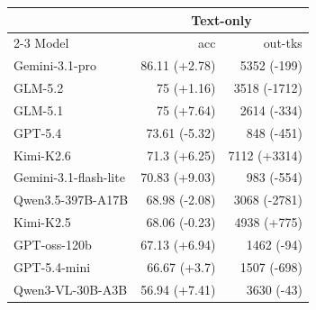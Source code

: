 \centering
\footnotesize
\setlength{\tabcolsep}{4pt}
\label{tab:tool-use-comparison}
\begin{tabular}{lrr}
\toprule
 & \multicolumn{2}{c}{\textbf{Text-only}} \\
\cmidrule(lr){2-3}
Model & acc & out-tks \\
\midrule
Gemini-3.1-pro & 86.11 {\scriptsize\textcolor{green!70!black}{(+2.78)}} & 5352 {\scriptsize\textcolor{green!70!black}{(-199)}} \\
GLM-5.2 & 75 {\scriptsize\textcolor{green!70!black}{(+1.16)}} & 3518 {\scriptsize\textcolor{green!70!black}{(-1712)}} \\
GLM-5.1 & 75 {\scriptsize\textcolor{green!70!black}{(+7.64)}} & 2614 {\scriptsize\textcolor{green!70!black}{(-334)}} \\
GPT-5.4 & 73.61 {\scriptsize\textcolor{red!70!black}{(-5.32)}} & 848 {\scriptsize\textcolor{green!70!black}{(-451)}} \\
Kimi-K2.6 & 71.3 {\scriptsize\textcolor{green!70!black}{(+6.25)}} & 7112 {\scriptsize\textcolor{red!70!black}{(+3314)}} \\
Gemini-3.1-flash-lite & 70.83 {\scriptsize\textcolor{green!70!black}{(+9.03)}} & 983 {\scriptsize\textcolor{green!70!black}{(-554)}} \\
Qwen3.5-397B-A17B & 68.98 {\scriptsize\textcolor{red!70!black}{(-2.08)}} & 3068 {\scriptsize\textcolor{green!70!black}{(-2781)}} \\
Kimi-K2.5 & 68.06 {\scriptsize\textcolor{red!70!black}{(-0.23)}} & 4938 {\scriptsize\textcolor{red!70!black}{(+775)}} \\
GPT-oss-120b & 67.13 {\scriptsize\textcolor{green!70!black}{(+6.94)}} & 1462 {\scriptsize\textcolor{green!70!black}{(-94)}} \\
GPT-5.4-mini & 66.67 {\scriptsize\textcolor{green!70!black}{(+3.7)}} & 1507 {\scriptsize\textcolor{green!70!black}{(-698)}} \\
Qwen3-VL-30B-A3B & 56.94 {\scriptsize\textcolor{green!70!black}{(+7.41)}} & 3630 {\scriptsize\textcolor{green!70!black}{(-43)}} \\
\bottomrule
\end{tabular}